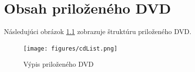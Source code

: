 \documentclass[11pt,twoside,a4paper]{book}
\begin{document}



\chapter{Obsah priloženého DVD}

Následujúci obrázok \ref{fig:seznamcd} zobrazuje štruktúru priloženého DVD.

\begin{figure}[h]
\begin{center}
\texttt{[image: figures/cdList.png]}
\caption{Výpis priloženého DVD}
\label{fig:seznamcd}
\end{center}
\end{figure}
\end{document}
